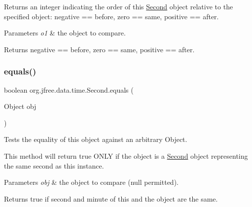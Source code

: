 Returns an integer indicating the order of this \mbox{\hyperlink{classorg_1_1jfree_1_1data_1_1time_1_1_second}{Second}} object relative to the specified object\+: negative == before, zero == same, positive == after.


\begin{DoxyParams}{Parameters}
{\em o1} & the object to compare.\\
\hline
\end{DoxyParams}
\begin{DoxyReturn}{Returns}
negative == before, zero == same, positive == after. 
\end{DoxyReturn}
\mbox{\label{classorg_1_1jfree_1_1data_1_1time_1_1_second_ad1879c287aa958bf7bff3d387b76cf10}} 
\subsubsection{\texorpdfstring{equals()}{equals()}}
{\footnotesize\ttfamily boolean org.\+jfree.\+data.\+time.\+Second.\+equals (\begin{DoxyParamCaption}\item[{Object}]{obj }\end{DoxyParamCaption})}

Tests the equality of this object against an arbitrary Object. 

This method will return true O\+N\+LY if the object is a \mbox{\hyperlink{classorg_1_1jfree_1_1data_1_1time_1_1_second}{Second}} object representing the same second as this instance.


\begin{DoxyParams}{Parameters}
{\em obj} & the object to compare ({\ttfamily null} permitted).\\
\hline
\end{DoxyParams}
\begin{DoxyReturn}{Returns}
{\ttfamily true} if second and minute of this and the object are the same. 
\end{DoxyReturn}
\mbox{\label{classorg_1_1jfree_1_1data_1_1time_1_1_second_a86421f4381011662af27c142e677e20b}} 
